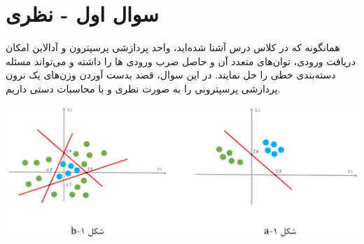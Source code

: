 \section{سوال اول - نظری}

همانگونه که در کلاس درس آشنا شده‌اید، واحد پردازشی پرسپترون و آدالاین امکان دریافت ورودی، توان‌های متعدد آن و حاصل ضرب ورودی ها را داشته و می‌تواند مسئله دسته‌بندی خطی را حل نمایند. در این سوال، قصد بدست آوردن وزن‌های یک نرون پردازشی پرسپترونی را به صورت نطری و با محاسبات دستی داریم.




\begin{center}
	\includegraphics*[width=1\linewidth]{pics/img1.png}
	\label{مسئله مورد بحث در سوال۱}
\end{center}



